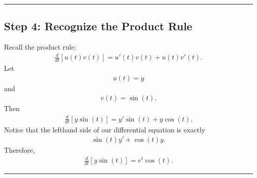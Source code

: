 \documentclass[letterpaper,10pt,english]{sphinxmanual}
\begin{document}
\bigskip\hrule\bigskip



\subsection{Step 4: Recognize the Product Rule}
\label{\detokenize{Language/Science_language/ODE_calculus/course_MATH_3035/homework_assignments/index_pdf:step-4-recognize-the-product-rule}}
\sphinxAtStartPar
Recall the product rule:
\begin{equation*}
\begin{split}\frac{d}{dt}[u(t)v(t)]
=
u'(t)v(t)
+
u(t)v'(t).\end{split}
\end{equation*}
\sphinxAtStartPar
Let
\begin{equation*}
\begin{split}u(t)=y\end{split}
\end{equation*}
\sphinxAtStartPar
and
\begin{equation*}
\begin{split}v(t)=\sin(t).\end{split}
\end{equation*}
\sphinxAtStartPar
Then
\begin{equation*}
\begin{split}\frac{d}{dt}[y\sin(t)]
=
y'\sin(t)
+
y\cos(t).\end{split}
\end{equation*}
\sphinxAtStartPar
Notice that the left\sphinxhyphen{}hand side of our differential equation is exactly
\begin{equation*}
\begin{split}\sin(t)y'
+
\cos(t)y.\end{split}
\end{equation*}
\sphinxAtStartPar
Therefore,
\begin{equation*}
\begin{split}\frac{d}{dt}[y\sin(t)]
=
e^t\cos(t).\end{split}
\end{equation*}

\bigskip\hrule\bigskip
\end{document}
